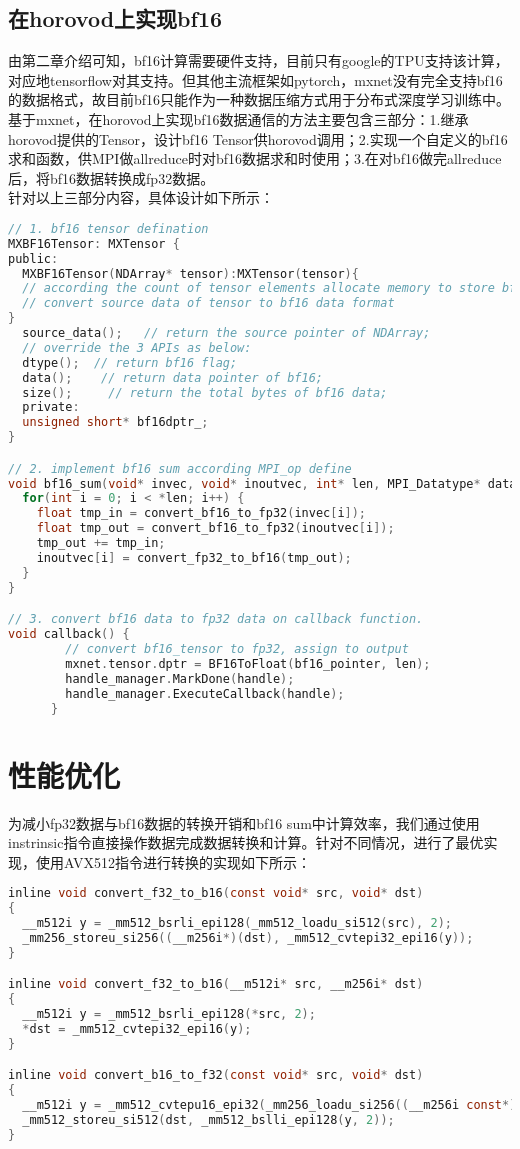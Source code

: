 \subsection{在horovod上实现bf16}
由第二章介绍可知，bf16计算需要硬件支持，目前只有google的TPU支持该计算，对应地tensorflow对其支持。但其他主流框架如pytorch，mxnet没有完全支持bf16的数据格式，故目前bf16只能作为一种数据压缩方式用于分布式深度学习训练中。基于mxnet，在horovod上实现bf16数据通信的方法主要包含三部分：1.继承horovod提供的Tensor，设计bf16 Tensor供horovod调用；2.实现一个自定义的bf16求和函数，供MPI做allreduce时对bf16数据求和时使用；3.在对bf16做完allreduce后，将bf16数据转换成fp32数据。\\
针对以上三部分内容，具体设计如下所示：
\begin{lstlisting}[language=C, numbers=none]
// 1. bf16 tensor defination
MXBF16Tensor: MXTensor {
public:
  MXBF16Tensor(NDArray* tensor):MXTensor(tensor){
  // according the count of tensor elements allocate memory to store bf16 data;
  // convert source data of tensor to bf16 data format
}
  source_data();   // return the source pointer of NDArray;
  // override the 3 APIs as below:
  dtype();  // return bf16 flag;
  data();    // return data pointer of bf16;
  size();     // return the total bytes of bf16 data;
  private:
  unsigned short* bf16dptr_;
}

// 2. implement bf16 sum according MPI_op define
void bf16_sum(void* invec, void* inoutvec, int* len, MPI_Datatype* datatype) {
  for(int i = 0; i < *len; i++) {
    float tmp_in = convert_bf16_to_fp32(invec[i]);
    float tmp_out = convert_bf16_to_fp32(inoutvec[i]);
    tmp_out += tmp_in;
    inoutvec[i] = convert_fp32_to_bf16(tmp_out);
  }
}

// 3. convert bf16 data to fp32 data on callback function.
void callback() {
        // convert bf16_tensor to fp32, assign to output
        mxnet.tensor.dptr = BF16ToFloat(bf16_pointer, len);
        handle_manager.MarkDone(handle);
        handle_manager.ExecuteCallback(handle);
      }
\end{lstlisting}
\section{性能优化}
为减小fp32数据与bf16数据的转换开销和bf16 sum中计算效率，我们通过使用instrinsic指令直接操作数据完成数据转换和计算。针对不同情况，进行了最优实现，使用AVX512指令进行转换的实现如下所示：
\begin{lstlisting}[language=C, numbers=none]
inline void convert_f32_to_b16(const void* src, void* dst)
{
  __m512i y = _mm512_bsrli_epi128(_mm512_loadu_si512(src), 2);
  _mm256_storeu_si256((__m256i*)(dst), _mm512_cvtepi32_epi16(y));
}

inline void convert_f32_to_b16(__m512i* src, __m256i* dst)
{
  __m512i y = _mm512_bsrli_epi128(*src, 2);
  *dst = _mm512_cvtepi32_epi16(y);
}

inline void convert_b16_to_f32(const void* src, void* dst)
{
  __m512i y = _mm512_cvtepu16_epi32(_mm256_loadu_si256((__m256i const*)src));
  _mm512_storeu_si512(dst, _mm512_bslli_epi128(y, 2));
}
\end{lstlisting}

